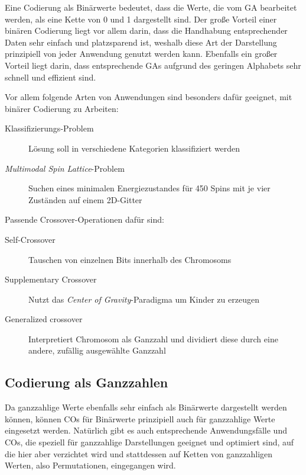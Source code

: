 \documentclass{llncs}
\begin{document}
		Eine Codierung als Binärwerte bedeutet, dass die Werte, die vom GA bearbeitet werden, als eine Kette von 0 und 1 dargestellt sind. Der große Vorteil einer binären Codierung liegt vor allem darin, dass die Handhabung entsprechender Daten sehr einfach und platzsparend ist, weshalb diese Art der Darstellung prinzipiell von jeder Anwendung genutzt werden kann. Ebenfalls ein großer Vorteil liegt darin, dass entsprechende GAs aufgrund des geringen Alphabets sehr schnell und effizient sind.\cite{TacklingRealCodedGA}
		
		Vor allem folgende Arten von Anwendungen sind besonders dafür geeignet, mit binärer Codierung zu Arbeiten:\cite{Survey}
		\begin{description}
			\item[Klassifizierungs-Problem] Lösung soll in verschiedene Kategorien klassifiziert werden\cite{NearestNeighborClassifier}
			\item[\textit{Multimodal Spin Lattice}-Problem] Suchen eines minimalen Ener\-gie\-zu\-stan\-des für 450 Spins mit je vier Zuständen auf einem 2D-Gitter\cite{SelectionSchemesSpatialIsolation}
		\end{description}
		
		Passende Crossover-Operationen dafür sind:
		\begin{description}
			\item[Self-Crossover] Tauschen von einzelnen Bits innerhalb des Chromosoms\cite{SelfCrossover}
			\item[Supplementary Crossover] Nutzt das \textit{Center of Gravity}-Paradigma um Kin\-der zu erzeugen\cite{SupplementaryCrossover}
			\item[Generalized crossover] Interpretiert Chromosom als Ganzzahl und dividiert diese durch eine andere, zufällig ausgewählte Ganzzahl\cite{GeneralizedCrossover}
		\end{description}
	
	\subsection{Codierung als Ganzzahlen}
	\label{sec:IntCod}
	
		Da ganzzahlige Werte ebenfalls sehr einfach als Binärwerte dargestellt werden können, können COs für Binärwerte prinzipiell auch für ganzzahlige Werte eingesetzt werden. Natürlich gibt es auch entsprechende Anwendungsfälle und COs, die speziell für ganzzahlige Darstellungen geeignet und optimiert sind, auf die hier aber verzichtet wird und stattdessen auf Ketten von ganzzahligen Werten, also Permutationen, eingegangen wird.
		
\end{document}
